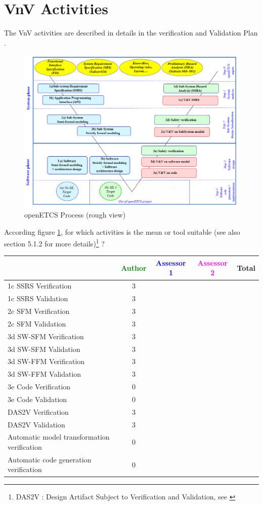 \section{VnV Activities}

The VnV activities are described in details in the verification and Validation Plan  \citep{D4.1}.

\begin{figure}[htb]
  \centering
  \includegraphics[width=.9\textwidth]{images/ProcessOpenETCS-BeM.png}
  \caption{openETCS Process (rough view)}
  \label{fig:openETCSProcess}
\end{figure}

According figure \ref{fig:openETCSProcess}, for which activities is the mean or tool suitable (see also \citep{D4.1} section 5.1.2 for more details)\footnote{DAS2V : Design Artifact Subject to Verification and Validation, see \citep{D4.1}} ?


\begin{tabular}{|l | c | c | c | c|}
\hline
& \textcolor{green}{Author} & \textcolor{blue}{Assessor 1} & \textcolor{magenta}{Assessor 2} & Total \\
\hline 
1c SSRS Verification & 3& & &  \\
\hline
1c SSRS Validation & 3& & &  \\
\hline
2c SFM Verification & 3& & &  \\
\hline
2c SFM Validation & 3& & &  \\
\hline
3d SW-SFM Verification &3 & & &  \\
\hline
3d SW-SFM Validation & 3& & &  \\
\hline
3d SW-FFM Verification & 3& & &  \\
\hline
3d SW-FFM Validation & 3& & &  \\
\hline
3e Code Verification &0 & & &  \\
\hline
3e Code Validation &0 & & &  \\
\hline
DAS2V Verification &3 & & &  \\
\hline
DAS2V Validation &3 & & &  \\
\hline
Automatic model transformation verification &0 & & &  \\
\hline
Automatic code generation verification &0 & & &  \\
\hline
\end{tabular}


